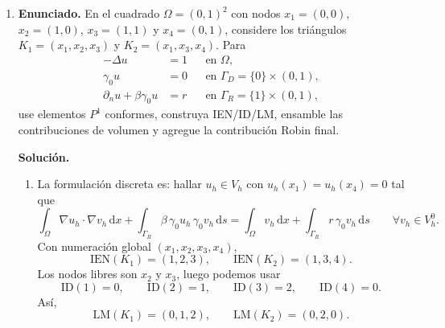\documentclass[11pt]{article}
\def\dx{\mbox{\(\,\mathrm{d}x\)}}
\def\ds{\mbox{\(\,\mathrm{d}s\)}}
\begin{document}
\begin{enumerate}[label=\textbf{\arabic*.}, leftmargin=*]
    \item \textbf{Enunciado.} En el cuadrado $\Omega=(0,1)^2$ con nodos $x_1=(0,0)$, $x_2=(1,0)$, $x_3=(1,1)$ y $x_4=(0,1)$, considere los triángulos $K_1=(x_1,x_2,x_3)$ y $K_2=(x_1,x_3,x_4)$. Para
    \[
    \begin{aligned}
        -\Delta u&=1 &&\text{en }\Omega,\\
        \gamma_0u&=0 &&\text{en }\Gamma_D=\{0\}\times(0,1),\\
        \partial_nu+\beta\gamma_0u&=r &&\text{en }\Gamma_R=\{1\}\times(0,1),
    \end{aligned}
    \]
    use elementos $P^1$ conformes, construya IEN/ID/LM, ensamble las contribuciones de volumen y agregue la contribución Robin final.

    \textbf{Solución.}
    \begin{enumerate}[label=(\alph*)]
        \item La formulación discreta es: hallar $u_h\in V_h$ con $u_h(x_1)=u_h(x_4)=0$ tal que
        \[
            \int_\Omega \nabla u_h\cdot\nabla v_h\dx
            +\int_{\Gamma_R}\beta\,\gamma_0u_h\,\gamma_0v_h\ds
            =
            \int_\Omega v_h\dx+\int_{\Gamma_R}r\,\gamma_0v_h\ds
            \qquad\forall v_h\in V_h^0.
        \]
        Con numeración global $(x_1,x_2,x_3,x_4)$,
        \[
            \mathrm{IEN}(K_1)=(1,2,3),
            \qquad
            \mathrm{IEN}(K_2)=(1,3,4).
        \]
        Los nodos libres son $x_2$ y $x_3$, luego podemos usar
        \[
            \mathrm{ID}(1)=0,\qquad
            \mathrm{ID}(2)=1,\qquad
            \mathrm{ID}(3)=2,\qquad
            \mathrm{ID}(4)=0.
        \]
        Así,
        \[
            \mathrm{LM}(K_1)=(0,1,2),
            \qquad
            \mathrm{LM}(K_2)=(0,2,0).
        \]


\end{enumerate}
\end{enumerate}
\end{document}
